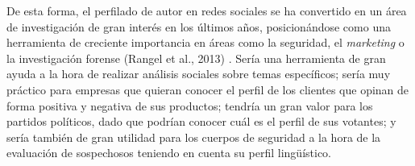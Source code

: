 \bigskip
De esta forma, el perfilado de autor en redes sociales se ha convertido en un área de investigación de gran interés
en los últimos años, posicionándose como una herramienta de creciente importancia en áreas como la seguridad, el \textit{marketing}
o la investigación forense (Rangel et al., 2013) \cite{rangel2013overview}. Sería una herramienta de gran ayuda a la hora de realizar
análisis sociales sobre temas específicos; sería muy práctico para empresas que quieran conocer el perfil de los clientes que opinan de 
forma positiva y negativa de sus productos; tendría un gran valor
para los partidos políticos, dado que podrían conocer cuál es el perfil de sus votantes; y sería también de gran utilidad para los cuerpos de seguridad
a la hora de la evaluación de sospechosos teniendo en cuenta su perfil lingüístico.
